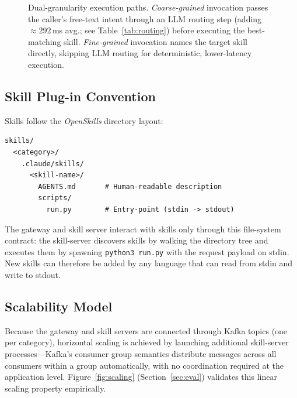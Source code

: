 \documentclass[sigconf,nonacm]{acmart}
\begin{document}
\begin{figure}[h]
\caption{Dual-granularity execution paths. \emph{Coarse-grained} invocation
  passes the caller's free-text intent through an LLM routing step
  (adding ${\approx}292$\,ms avg.; see Table~\ref{tab:routing}) before
  executing the best-matching skill. \emph{Fine-grained} invocation names the
  target skill directly, skipping LLM routing for deterministic,
  lower-latency execution.}
\label{fig:routing}
\end{figure}

\subsection{Skill Plug-in Convention}

Skills follow the \emph{OpenSkills} directory layout:

\begin{lstlisting}[style=yamlcode, caption={OpenSkills directory convention.}]
skills/
  <category>/
    .claude/skills/
      <skill-name>/
        AGENTS.md       # Human-readable description
        scripts/
          run.py        # Entry-point (stdin -> stdout)
\end{lstlisting}

The gateway and skill server interact with skills only through this file-system contract: the skill-server discovers skills by walking the directory tree and executes them by spawning \texttt{python3 run.py} with the request payload on stdin. New skills can therefore be added by any language that can read from stdin and write to stdout.

\subsection{Scalability Model}

Because the gateway and skill servers are connected through Kafka topics (one per category), horizontal scaling is achieved by launching additional skill-server processes---Kafka's consumer group semantics distribute messages across all consumers within a group automatically, with no coordination required at the application level. Figure~\ref{fig:scaling} (Section~\ref{sec:eval}) validates this linear scaling property empirically.
\end{document}
